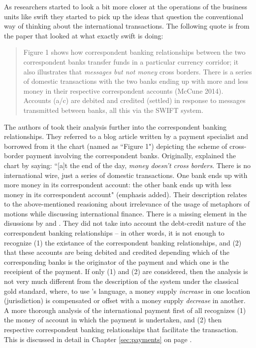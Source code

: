 As researchers started to look a bit more closer at the operations of the business units like \ac{swift} they started to pick up the ideas that question the conventional way of thinking about the international transactions. The following quote is from the paper that looked at what exactly \ac{swift} is doing: 

\begin{quote}
Figure 1 shows how correspondent banking relationships between the two 
correspondent banks transfer funds in a particular currency corridor; it also illustrates 
that \textit{messages but not money} cross borders. There is a series of domestic 
transactions with the two banks ending up with more and less money in their 
respective correspondent accounts (McCune 2014). Accounts (a/c) are debited and 
credited (settled) in response to messages transmitted between banks, all this via the 
SWIFT system. \citep[p.~7, emphasis added]{robinson2018}
\end{quote}

The authors of \cite{robinson2018} took their analysis further into the correspondent banking relationships. They referred to a blog article \citeauthor{mccune2014} written by a payment specialist and borrowed from it the chart (named as ``Figure 1") depicting the scheme of cross-border payment involving the correspondent banks. Originally, \cite{mccune2014} explained the chart by saying: ``[a]t the end of the day, \textit{money doesn't cross borders}. There is no international wire, just a series of domestic transactions. One bank ends up with more money in its correspondent account: the other bank ends up with less money in its correspondent account" (emphasis added). Their description relates to the above-mentioned reasioning about irrelevance of the usage of metaphors of motions while discussing international finance. There is a missing element in the disussions by \cite{mccune2014} and \cite{robinson2018}. They did not take into account the debt-credit nature of the correspondent banking relationships -- in other words, it is not enough to recognize (1) the existance of the correspondent banking relationships, and (2) that these accounts are being debited and credited depending which of the corresponding banks is the originator of the payment and which one is the receipient of the payment. If only (1) and (2) are considered, then the analysis is not very much different from the description of the system under the classical gold standard, where, to use \citeauthor{rueff1972}'s language, a money supply \textit{increase} in one location (jurisdiction) is compensated or offset with a money supply \textit{decrease} in another. A more thorough analysis of the international payment first of all recognizes (1) the money of account in which the payment is undertaken, and (2) then respective correspondent banking relationships that facilitate the transaction. This is discussed in detail in Chapter \ref{sec:payments} on page \pageref{sec:payments}.

